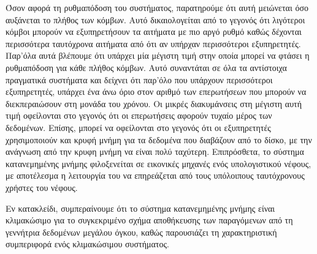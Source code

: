 Όσον αφορά τη ρυθμαπόδοση του συστήματος, παρατηρούμε ότι αυτή μειώνεται όσο αυξάνεται το πλήθος των κόμβων. Αυτό δικαιολογείται από το γεγονός ότι λιγότεροι κόμβοι 
μπορούν να εξυπηρετήσουν τα αιτήματα με πιο αργό ρυθμό καθώς δέχονται περισσότερα ταυτόχρονα αιτήματα από ότι αν υπήρχαν περισσότεροι εξυπηρετητές. Παρ'όλα αυτά βλέπουμε 
ότι υπάρχει μία μέγιστη τιμή στην οποία μπορεί να φτάσει η ρυθμαπόδοση για κάθε πλήθος κόμβων. Αυτό συναντάται σε όλα τα αντίστοιχα πραγματικά συστήματα και δείχνει ότι 
παρ'όλο που υπάρχουν περισσότεροι εξυπηρετητές, υπάρχει ένα άνω όριο στον αριθμό των επερωτήσεων που μπορούν να διεκπεραιώσουν στη μονάδα του χρόνου. Οι 
μικρές διακυμάνσεις στη μέγιστη αυτή τιμή οφείλονται στο γεγονός ότι οι επερωτήσεις αφορούν τυχαίο μέρος των δεδομένων. Επίσης, μπορεί να οφείλονται στο γεγονός ότι 
οι εξυπηρετητές χρησιμοποιούν και κρυφή μνήμη για τα δεδομένα που διαβάζουν από το δίσκο, με την ανάγνωση από την κρυφη μνήμη να είναι πολύ ταχύτερη. Επιπρόσθετα, 
το σύστημα κατανεμημένης μνήμης φιλοξενείται σε εικονικές μηχανές ενός υπολογιστικού νέφους, με αποτέλεσμα η λειτουργία του να επηρεάζεται από τους 
υπόλοιπους ταυτόχρονους χρήστες του νέφους. 

Εν κατακλείδι, συμπεραίνουμε ότι το σύστημα κατανεμημένης μνήμης είναι κλιμακώσιμο για το συγκεκριμένο σχήμα αποθήκευσης των παραγόμενων 
από τη γεννήτρια δεδομένων μεγάλου όγκου, καθώς παρουσιάζει τη χαρακτηριστική συμπεριφορά ενός κλιμακώσιμου συστήματος. 

